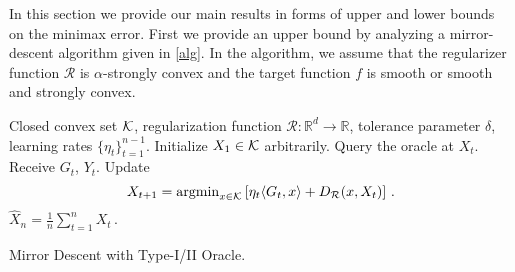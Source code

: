 In this section we provide our main results in forms of upper and lower bounds on the minimax error.
First we provide an upper bound by analyzing a mirror-descent algorithm given in \cref{alg}.
In the algorithm, we assume that the regularizer function $\mathcal{R}$ is $\alpha$-strongly convex and the target function $f$ is smooth or  smooth and strongly convex.

%

\begin{algorithm}[t]
\begin{algorithmic}
      Closed convex set $\mathcal{K}$, regularization function $\mathcal{R}:\mathbb{R}^d\to \mathbb{R}$, tolerance parameter $\delta$, learning rates $\{\eta_t\}_{t=1}^{n-1}$.
\State Initialize $X_1\in \mathcal{K}$ arbitrarily.
	\State Query the oracle at $X_t$.
	\State Receive $G_t$, $Y_t$.
	\State Update
	$$
	X_{t+1}=\operatorname{argmin}_{x\in \mathcal{K}}\left[ \eta_{t} \langle G_t,x \rangle+D_{\mathcal{R}}(x,X_t) \right] \,.
	$$
\EndFor
{} $\hat{X}_n = \frac{1}{n}\sum_{t=1}^n X_t \,.$
\end{algorithmic}
\caption{Mirror Descent with Type-I/II Oracle.}
\label{alg}
\end{algorithm}


%

